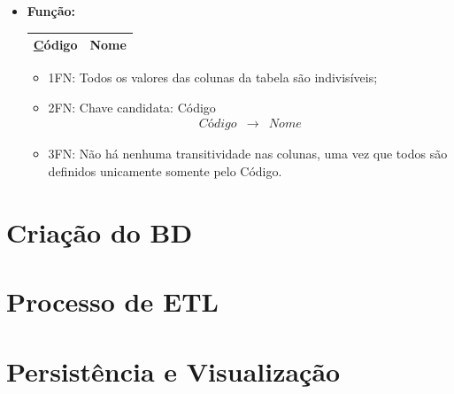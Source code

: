 \documentclass [12pt]{article}
\begin{document}
\begin{itemize}
		\item \textbf{Função:}
			\begin{table}[h]
				\centering
				\begin{tabular}{|c|c|} \hline
					{\ul Código} & Nome \\ \hline
				\end{tabular}
			\end{table}
			
			\begin{itemize}
				\item 1FN: Todos os valores das colunas da tabela são indivisíveis;
				\item 2FN: Chave candidata: Código
					\begin{eqnarray*}
						Código & \rightarrow & Nome
					\end{eqnarray*}
				\item 3FN: Não há nenhuma transitividade nas colunas, uma vez que todos são definidos unicamente somente pelo Código.
			\end{itemize}
	\end{itemize}
		
	\section{Criação do BD}
		\label{sec:BDcreate}
		
	\section{Processo de ETL}
		\label{sec:ETL}
		
	\section{Persistência e Visualização}
		\label{sec:Per&Vis}
\end{document}
